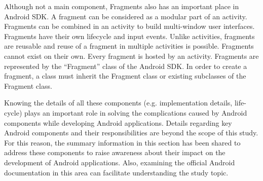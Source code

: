 Although not a main component, Fragments also has an important place in Android SDK. A fragment can be considered as a modular part of an activity. Fragments can be combined in an activity to build multi-window user interfaces. Fragments have their own lifecycle and input events. Unlike activities, fragments are reusable and reuse of a fragment in multiple activities is possible. Fragments cannot exist on their own. Every fragment is hosted by an activity. Fragments are represented by the “Fragment” class of the Android SDK. In order to create a fragment, a class must inherit the Fragment class or existing subclasses of the Fragment class.

Knowing the details of all these components (e.g. implementation details, life-cycle) plays an important role in solving the complications caused by Android components while developing Android applications. Details regarding key Android components and their responsibilities are beyond the scope of this study. For this reason, the summary information in this section has been shared to address these components to raise awareness about their impact on the development of Android applications. Also, examining the official Android documentation in this area can facilitate understanding the study topic.